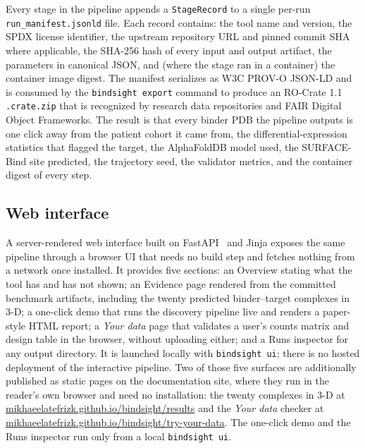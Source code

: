 \documentclass[11pt,letterpaper]{article}
\begin{document}
Every stage in the pipeline appends a \texttt{StageRecord} to a single
per-run \texttt{run\_manifest.jsonld} file. Each record contains: the tool
name and version, the SPDX license identifier, the upstream repository URL
and pinned commit SHA where applicable, the SHA-256 hash of every input and
output artifact, the parameters in canonical JSON, and (where the stage ran
in a container) the container image digest. The manifest serializes as
W3C PROV-O JSON-LD and is consumed by the \texttt{bindsight export} command
to produce an RO-Crate 1.1~\cite{SoilandReyes2022} \texttt{.crate.zip} that
is recognized by research data repositories and FAIR Digital Object
Frameworks.
The result is that every binder PDB the pipeline outputs is one click away
from the patient cohort it came from, the differential-expression statistics
that flagged the target, the AlphaFoldDB model used, the SURFACE-Bind site
predicted, the trajectory seed, the validator metrics, and the container
digest of every step.

\subsection{Web interface}

A server-rendered web interface built on FastAPI~\cite{FastAPI} and Jinja
exposes the same pipeline through a browser UI that needs no build step and
fetches nothing from a network once installed. It provides
five sections: an Overview stating what the tool has and has not shown; an
Evidence page rendered from the committed benchmark artifacts, including the
twenty predicted binder--target complexes in 3-D; a one-click demo that runs
the discovery pipeline live and renders a paper-style HTML report; a
\textit{Your data} page that validates a user's counts matrix and design table
in the browser, without uploading either; and a Runs inspector for any output
directory. It is launched locally with \texttt{bindsight ui}; there is no
hosted deployment of the interactive pipeline. Two of those five surfaces are
additionally published as static pages on the documentation site, where they
run in the reader's own browser and need no installation: the twenty complexes
in 3-D at \href{https://mikhaeelatefrizk.github.io/bindsight/results/}{mikhaeelatefrizk.github.io/bindsight/results}
and the \textit{Your data} checker at
\href{https://mikhaeelatefrizk.github.io/bindsight/try-your-data/}{mikhaeelatefrizk.github.io/bindsight/try-your-data}. The
one-click demo and the Runs inspector run only from a local
\texttt{bindsight ui}.
\end{document}
